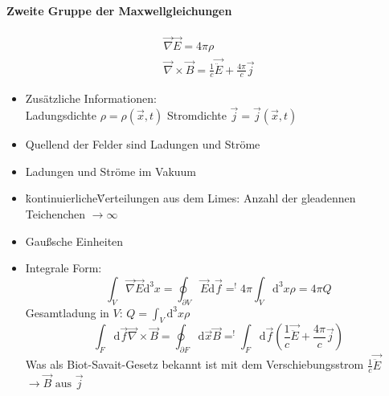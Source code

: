 \documentclass[a4paper]{article}
\begin{document}
\paragraph{Zweite Gruppe der Maxwellgleichungen}
\begin{align}
\vec{\nabla}\vec{E}=4\pi\rho\\
\vec{\nabla}\times\vec{B}=\frac{1}{c}\vec{\ddot{E}}+\frac{4\pi}{c}\vec{j}
\end{align}
\begin{itemize}
  \item Zusätzliche Informationen: \\
   Ladungsdichte $\rho=\rho(\vec{x},t)$
   Stromdichte $\vec{j}=\vec{j}(\vec{x},t)$
  \item Quellend der Felder sind Ladungen und Ströme
  \item Ladungen und Ströme im Vakuum
  \item \"kontinuierliche\" Verteilungen aus dem Limes: Anzahl der gleadennen
  Teichenchen $\rightarrow \infty$
  \item Gaußsche Einheiten
  \item Integrale Form: \begin{equation}
  \int_V\vec{\nabla}\vec{E}\mathrm{d}^3x=\oint_{\partial V}\vec{E}\mathrm{d}\vec{f}=^!
  4\pi\int_V\mathrm{d}^3x\rho =4\pi Q
  \end{equation} 
  Gesamtladung in $V$: $Q=\int_V \mathrm{d}^3x \rho$
  \begin{equation}
  \int_F \mathrm{d}\vec{f}\vec{\nabla}\times\vec{B}=\oint_{\partial F}\mathrm{d}\vec{x}\vec{B}=^!
  \int_F\mathrm{d}\vec{f}(\frac{1}{c}\vec{\ddot{E}}+\frac{4\pi}{c}\vec{j})
  \end{equation}
  Was als Biot-Savait-Gesetz bekannt ist mit dem Verschiebungsstrom
  $\frac{1}{c}\vec{\ddot{E}}$ \\
  $\rightarrow \vec{B} \text{ aus } \vec{j}$
\end{itemize}
\end{document}
